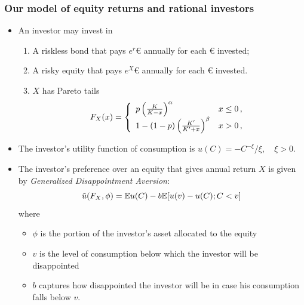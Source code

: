 \documentclass{beamer}
\begin{document}
\begin{frame}
  \frametitle{Our model of equity returns and rational investors}
  \begin{itemize}
    \item An investor may invest in
      \begin{enumerate}
      \item A riskless bond that pays $e^r$€ annually for each € invested;
      \item A risky equity that pays $e^X$€ annually for each € invested.
      \item $X$ has Pareto tails
        \[
        F_X(x) = \left\{
        \begin{array}{ll}
          p \left(
          {K \over K - x}
          \right)^\alpha & x \leq 0 \,,\\
          1 - (1 - p) \left(
          {K' \over K' + x}
          \right)^\beta & x > 0\,,
        \end{array}
        \right.
        \]
      \end{enumerate}
    \item  The investor's utility function of consumption is
      $u(C) = -C^{-\xi}/\xi, \quad \xi > 0$.
      \item The investor's preference over an equity that gives annual return $X$
        is given by {\em Generalized Disappointment Aversion}:
        \[
        \tilde u (F_X, \phi) = \mathbb{E} u(C) - b \mathbb{E} [u(v) - u(C); C < v]
        \]
        where
        \begin{itemize}
          \item $\phi$ is the portion of the investor's asset allocated
            to the equity
          \item $v$ is the level of consumption below which
            the investor will be disappointed
          \item $b$ captures how disappointed the investor will be in case his consumption
            falls below $v$.
        \end{itemize}
  \end{itemize}
\end{frame}
\end{document}
